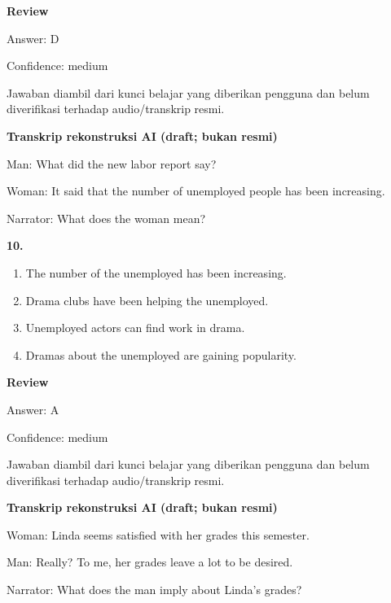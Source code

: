 \documentclass[12pt]{article}
\begin{document}
\par
\begingroup
\setlength{\parskip}{0pt}
\setlength{\parindent}{0pt}
\textbf{Review}\par
Answer: D\par
Confidence: medium\par
Jawaban diambil dari kunci belajar yang diberikan pengguna dan belum diverifikasi terhadap audio/transkrip resmi.\par
\endgroup
\par
\vspace{0.25\baselineskip}
\begin{exampleblock}
\textbf{Transkrip rekonstruksi AI (draft; bukan resmi)}\par
Man: What did the new labor report say?\par
Woman: It said that the number of unemployed people has been increasing.\par
Narrator: What does the woman mean?\par
\end{exampleblock}
\noindent\textbf{10.}
\begin{enumerate}[label=(\Alph*),leftmargin=*,itemsep=0.2em]
\item The number of the unemployed has been increasing.
\item Drama clubs have been helping the unemployed.
\item Unemployed actors can find work in drama.
\item Dramas about the unemployed are gaining popularity.
\end{enumerate}
\par
\begingroup
\setlength{\parskip}{0pt}
\setlength{\parindent}{0pt}
\textbf{Review}\par
Answer: A\par
Confidence: medium\par
Jawaban diambil dari kunci belajar yang diberikan pengguna dan belum diverifikasi terhadap audio/transkrip resmi.\par
\endgroup
\par
\vspace{0.25\baselineskip}
\begin{exampleblock}
\textbf{Transkrip rekonstruksi AI (draft; bukan resmi)}\par
Woman: Linda seems satisfied with her grades this semester.\par
Man: Really? To me, her grades leave a lot to be desired.\par
Narrator: What does the man imply about Linda's grades?\par
\end{exampleblock}
\end{document}
